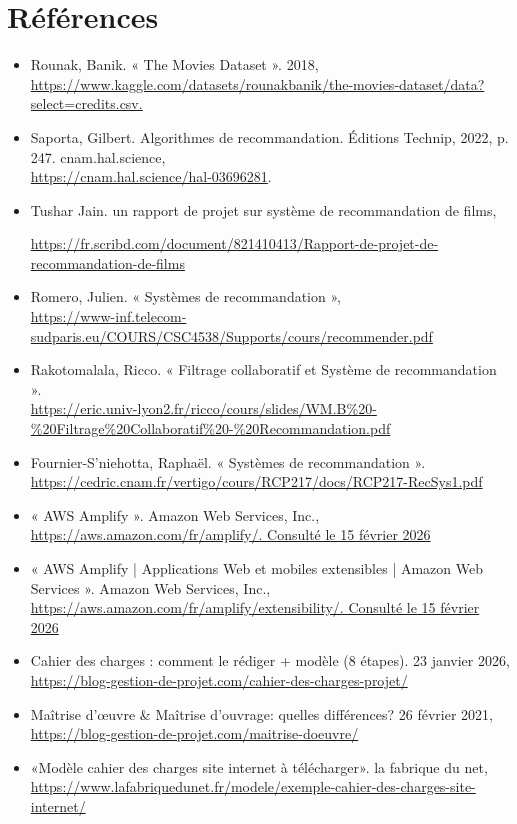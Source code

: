 \documentclass[a4paper,12pt]{report}
\begin{document}
\chapter*{Références}
\begin{itemize}
    \item Rounak,  Banik. « The Movies Dataset ». 2018,\\ \url{https://www.kaggle.com/datasets/rounakbanik/the-movies-dataset/data?select=credits.csv.}
    
    \item Saporta, Gilbert. Algorithmes de recommandation. Éditions Technip, 2022, p. 247. cnam.hal.science,\\ \url{https://cnam.hal.science/hal-03696281}.
    \item Tushar Jain. un rapport de projet sur système de recommandation de films,
    \begin{flushleft}\url{https://fr.scribd.com/document/821410413/Rapport-de-projet-de-recommandation-de-films}\end{flushleft}
    \item Romero, Julien. « Systèmes de recommandation »,\\
    \url{https://www-inf.telecom-sudparis.eu/COURS/CSC4538/Supports/cours/recommender.pdf}
    \item Rakotomalala, Ricco. « Filtrage collaboratif et Système de recommandation ».\\
    \url{https://eric.univ-lyon2.fr/ricco/cours/slides/WM.B%20-%20Filtrage%20Collaboratif%20-%20Recommandation.pdf}
    \item Fournier-S’niehotta, Raphaël. « Systèmes de recommandation ».\\
    \url{https://cedric.cnam.fr/vertigo/cours/RCP217/docs/RCP217-RecSys1.pdf}


    \item « AWS Amplify ». Amazon Web Services, Inc.,\\ \url{https://aws.amazon.com/fr/amplify/. Consulté le 15 février 2026}
    \item « AWS Amplify | Applications Web et mobiles extensibles | Amazon Web Services ». Amazon Web Services, Inc.,\\ \url{https://aws.amazon.com/fr/amplify/extensibility/. Consulté le 15 février 2026}

    \item Cahier des charges : comment le rédiger + modèle (8 étapes). 23 janvier 2026,\\
    \url{https://blog-gestion-de-projet.com/cahier-des-charges-projet/}
    \item Maîtrise d’œuvre \& Maîtrise d’ouvrage: quelles différences? 26 février 2021,\\
    \url{https://blog-gestion-de-projet.com/maitrise-doeuvre/}
    \item «Modèle cahier des charges site internet à télécharger». la fabrique du net,\\
    \url{https://www.lafabriquedunet.fr/modele/exemple-cahier-des-charges-site-internet/}


\end{itemize}
\end{document}
